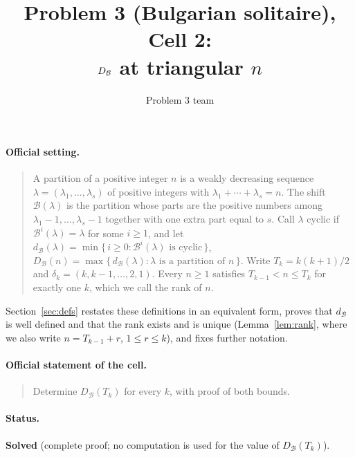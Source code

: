 \documentclass[11pt]{article}
\author{Problem 3 team}
\title{Problem 3 (Bulgarian solitaire), Cell 2:\\ $\DB$ at triangular $n$}
\date{}
\theoremstyle{definition}
\newcommand{\B}{\mathcal{B}}
\newcommand{\dB}{d_{\mathcal{B}}}
\newcommand{\DB}{D_{\mathcal{B}}}
\renewcommand{\le}{\leqslant}
\renewcommand{\ge}{\geqslant}
\begin{document}
\maketitle

\paragraph{Official setting.}
\begin{quote}
A partition of a positive integer $n$ is a weakly decreasing sequence $\lambda=(\lambda_1,\dots,\lambda_s)$ of
positive integers with $\lambda_1+\cdots+\lambda_s=n$.  The shift $\B(\lambda)$ is the partition whose parts are the
positive numbers among $\lambda_1-1,\dots,\lambda_s-1$ together with one extra part equal to $s$.  Call $\lambda$
cyclic if $\B^i(\lambda)=\lambda$ for some $i\ge1$, and let $\dB(\lambda)=\min\{\,i\ge0:\B^i(\lambda)\text{ is cyclic}\,\}$,
$\DB(n)=\max\{\,\dB(\lambda):\lambda\text{ is a partition of }n\,\}$.  Write $T_k=k(k+1)/2$ and
$\delta_k=(k,k-1,\dots,2,1)$.  Every $n\ge1$ satisfies $T_{k-1}<n\le T_k$ for exactly one $k$, which we call the
rank of $n$.
\end{quote}
Section~\ref{sec:defs} restates these definitions in an equivalent form, proves that $\dB$ is well defined and
that the rank exists and is unique (Lemma~\ref{lem:rank}, where we also write $n=T_{k-1}+r$, $1\le r\le k$), and
fixes further notation.

\paragraph{Official statement of the cell.}
\begin{quote}
Determine $\DB(T_k)$ for every $k$, with proof of both bounds.
\end{quote}

\paragraph{Status.} \textbf{Solved} (complete proof; no computation is used for the value of $\DB(T_k)$).
\end{document}

